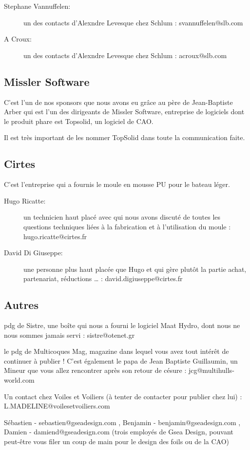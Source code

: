 \documentclass[a4paper, 11pt]{report}
\begin{document}
\begin{description}
\item[Stephane Vannuffelen:]un des contacts d’Alexndre Levesque chez Schlum : svannuffelen@slb.com
\item[A Croux:]un des contacts d’Alexndre Levesque chez Schlum : acroux@slb.com

\end{description}

\subsection{Missler Software}
C'est l'un de nos sponsors que nous avons eu grâce au père de Jean-Baptiste Arber qui est l'un des dirigeants de Missler Software, entreprise de logiciels dont le produit phare est Topsolid, un logiciel de CAO. 

Il est très important de les nommer TopSolid dans toute la communication faite.

\subsection{Cirtes}
C'est l'entreprise qui a fournis le moule en mousse PU pour le bateau léger.

\begin{description}
\item[Hugo Ricatte:]un technicien haut placé avec qui nous avons discuté de toutes les questions techniques liées à la fabrication et à l’utilisation du moule
 : hugo.ricatte@cirtes.fr
\item[David Di Giuseppe:]une personne plus haut placée que Hugo et qui gère plutôt la partie achat, partenariat, réductions … : david.digiuseppe@cirtes.fr
\end{description}

\subsection{Autres}

\begin{description}
\item[Marc Pommelet:]pdg de Sistre, une boîte qui nous a fourni le logiciel Maat Hydro, dont nous ne nous sommes jamais servi : sistre@otenet.gr
\item[Jean Christophe Guillaumin:]le pdg de Multicoques Mag, magazine dans lequel vous avez tout intérêt de continuer à publier ! C’est également le papa de Jean Baptiste Guillaumin, un Mineur que vous allez rencontrer après son retour de césure : jcg@multihulls-world.com
\item Un contact chez Voiles et Voiliers (à tenter de contacter pour publier chez lui) : L.MADELINE@voilesetvoiliers.com
\item Sébastien - sebastien@gseadesign.com , Benjamin - benjamin@gseadesign.com , Damien - damiend@gseadesign.com  (trois employés de Gsea Design, pouvant peut-être vous filer un coup de main pour le design des foils ou de la CAO)
\end{description}
\end{document}
